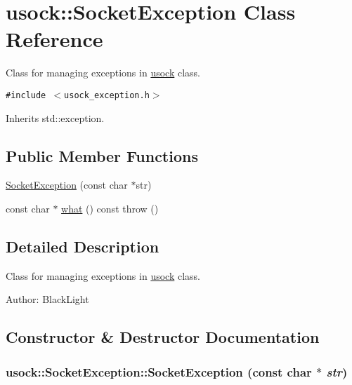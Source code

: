\hypertarget{classusock_1_1SocketException}{
\section{usock::SocketException Class Reference}
\label{classusock_1_1SocketException}
}
Class for managing exceptions in \hyperlink{namespaceusock}{usock} class.  


{\tt \#include $<$usock\_\-exception.h$>$}

Inherits std::exception.

\subsection*{Public Member Functions}
\begin{CompactItemize}
\item 
\hyperlink{classusock_1_1SocketException_070830054f67291432f897e77bd9be48}{SocketException} (const char $\ast$str)
\item 
const char $\ast$ \hyperlink{classusock_1_1SocketException_8ad4730be89374b7ee56d56b2617f7a1}{what} () const   throw ()
\end{CompactItemize}


\subsection{Detailed Description}
Class for managing exceptions in \hyperlink{namespaceusock}{usock} class. 

\begin{Desc}
\item[Author:]BlackLight \end{Desc}


\subsection{Constructor \& Destructor Documentation}
\hypertarget{classusock_1_1SocketException_070830054f67291432f897e77bd9be48}{
\subsubsection[{SocketException}]{\setlength{\rightskip}{0pt plus 5cm}usock::SocketException::SocketException (const char $\ast$ {\em str})}}
\label{classusock_1_1SocketException_070830054f67291432f897e77bd9be48}





